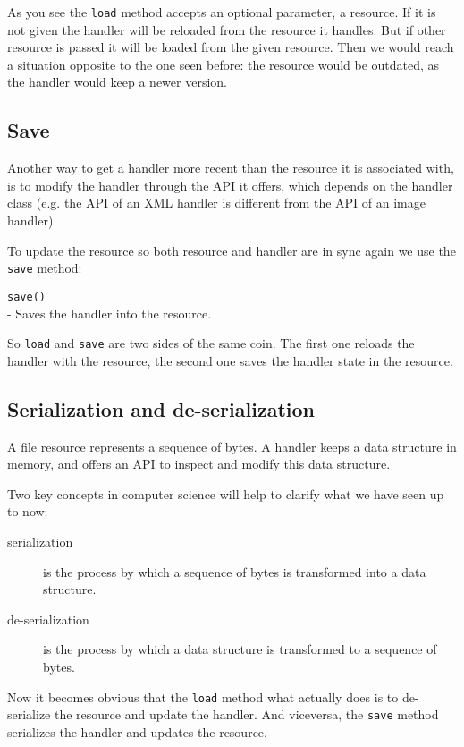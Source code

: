 As you see the {\tt load} method accepts an optional parameter, a resource.
If it is not given the handler will be reloaded from the resource it handles.
But if other resource is passed it will be loaded from the given resource.
Then we would reach a situation opposite to the one seen before: the resource
would be outdated, as the handler would keep a newer version.


\subsection{Save}

Another way to get a handler more recent than the resource it is associated
with, is to modify the handler through the API it offers, which depends
on the handler class (e.g. the API of an XML handler is different from the
API of an image handler).

To update the resource so both resource and handler are in sync again we
use the {\tt save} method:

\begin{api}
  {\tt save()}\\
  - Saves the handler into the resource.
\end{api}

So {\tt load} and {\tt save} are two sides of the same coin. The first
one reloads the handler with the resource, the second one saves the
handler state in the resource.


\subsection{Serialization and de-serialization}

A file resource represents a sequence of bytes. A handler keeps a data
structure in memory, and offers an API to inspect and modify this data
structure.

Two key concepts in computer science will help to clarify what we have
seen up to now:

\begin{description}
  \item [serialization] is the process by which a sequence of bytes is
    transformed into a data structure.

  \item [de-serialization] is the process by which a data structure is
    transformed to a sequence of bytes.
\end{description}

Now it becomes obvious that the {\tt load} method what actually does is
to de-serialize the resource and update the handler. And viceversa, the
{\tt save} method serializes the handler and updates the resource.

